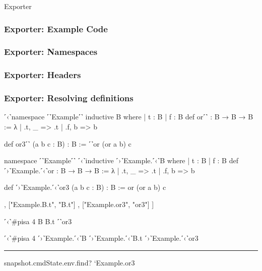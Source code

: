 \begin{frame}[fragile]{Exporter} %
  \frametitle<1>{Exporter: Example Code}
  \frametitle<2>{Exporter: Namespaces}
  \frametitle<3>{Exporter: Headers}
  \frametitle<4->{Exporter: Resolving definitions}

  \begin{overprint}
      \begin{LeanCodeHL}
        ˹‹˺namespace ˹˺Example˹˺
        inductive B where | t : B | f : B
        def or˹˺ : B → B → B := λ
          | .t, _ => .t
          | .f, b => b

        def or3˹˺ (a b c : B) : B := ˹˺or (or a b) c
      \end{LeanCodeHL}
      \begin{LeanCodeHL}
        namespace ˹˺Example˹˺
        ˹‹˺inductive ˹›˺Example.˹‹˺B where | t : B | f : B
        def ˹›˺Example.˹‹˺or : B → B → B := λ
          | .t, _ => .t
          | .f, b => b

        def ˹›˺Example.˹‹˺or3 (a b c : B) : B := or (or a b) c
      \end{LeanCodeHL}
      \begin{JsonCode}
        [ ["Example.B", "B"]
        , ["Example.B.t", "B.t"]
        , ["Example.or3", "or3"]
        ]
      \end{JsonCode}
  \end{overprint}
  \begin{overprint}
      \begin{LeanCodeHL}
        ˹‹˺#pisa 4 B B.t ˹˺or3
      \end{LeanCodeHL}
      \begin{LeanCodeHL}
        ˹‹˺#pisa 4 ˹›˺Example.˹‹˺B ˹›˺Example.˹‹˺B.t ˹›˺Example.˹‹˺or3
      \end{LeanCodeHL}
  \end{overprint}

  \begin{overprint}
      \rule{\linewidth}{0.4pt}

      \begin{LeanCode}[frame=none, fontsize=\normalsize]
        snapshot.cmdState.env.find? `Example.or3
      \end{LeanCode}
  \end{overprint}


\end{frame}
